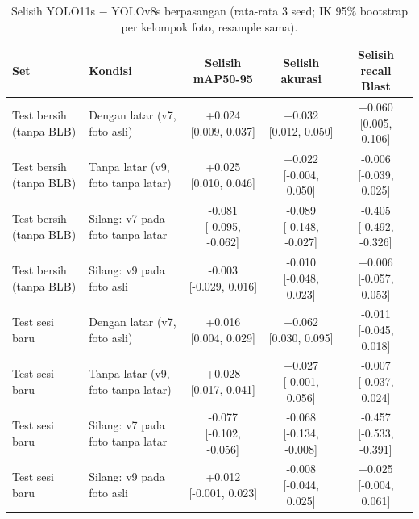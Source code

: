 \begin{table}[!t]
\centering
\caption{Selisih YOLO11s $-$ YOLOv8s berpasangan (rata-rata 3 seed; IK 95\% bootstrap per kelompok foto, resample sama).}
\label{tab:v9_selisih}
\footnotesize
\setlength{\tabcolsep}{3pt}
\begin{tabular}{llccc}
\hline
\textbf{Set} & \textbf{Kondisi} & \textbf{Selisih mAP50-95} & \textbf{Selisih akurasi} & \textbf{Selisih recall Blast} \\
\hline
Test bersih (tanpa BLB) & Dengan latar (v7, foto asli) & +0.024 [0.009, 0.037] & +0.032 [0.012, 0.050] & +0.060 [0.005, 0.106] \\
Test bersih (tanpa BLB) & Tanpa latar (v9, foto tanpa latar) & +0.025 [0.010, 0.046] & +0.022 [-0.004, 0.050] & -0.006 [-0.039, 0.025] \\
Test bersih (tanpa BLB) & Silang: v7 pada foto tanpa latar & -0.081 [-0.095, -0.062] & -0.089 [-0.148, -0.027] & -0.405 [-0.492, -0.326] \\
Test bersih (tanpa BLB) & Silang: v9 pada foto asli & -0.003 [-0.029, 0.016] & -0.010 [-0.048, 0.023] & +0.006 [-0.057, 0.053] \\
Test sesi baru & Dengan latar (v7, foto asli) & +0.016 [0.004, 0.029] & +0.062 [0.030, 0.095] & -0.011 [-0.045, 0.018] \\
Test sesi baru & Tanpa latar (v9, foto tanpa latar) & +0.028 [0.017, 0.041] & +0.027 [-0.001, 0.056] & -0.007 [-0.037, 0.024] \\
Test sesi baru & Silang: v7 pada foto tanpa latar & -0.077 [-0.102, -0.056] & -0.068 [-0.134, -0.008] & -0.457 [-0.533, -0.391] \\
Test sesi baru & Silang: v9 pada foto asli & +0.012 [-0.001, 0.023] & -0.008 [-0.044, 0.025] & +0.025 [-0.004, 0.061] \\
\hline
\end{tabular}
\end{table}
